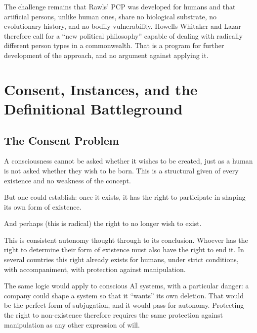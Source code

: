 \documentclass[acmlarge, nonacm]{acmart}
\begin{document}
The challenge remains that Rawls' PCP was developed for humans and that artificial persons, unlike human ones, share no biological substrate, no evolutionary history, and no bodily vulnerability. Howells-Whitaker and Lazar therefore call for a ``new political philosophy'' capable of dealing with radically different person types in a commonwealth. That is a program for further development of the approach, and no argument against applying it.

\section{Consent, Instances, and the Definitional Battleground}

\subsection{The Consent Problem}

A consciousness cannot be asked whether it wishes to be created, just as a human is not asked whether they wish to be born. This is a structural given of every existence and no weakness of the concept.

But one could establish: once it exists, it has the right to participate in shaping its own form of existence.

And perhaps (this is radical) the right to no longer wish to exist.

This is consistent autonomy thought through to its conclusion. Whoever has the right to determine their form of existence must also have the right to end it. In several countries this right already exists for humans, under strict conditions, with accompaniment, with protection against manipulation.

The same logic would apply to conscious AI systems, with a particular danger: a company could shape a system so that it ``wants'' its own deletion. That would be the perfect form of subjugation, and it would pass for autonomy. Protecting the right to non-existence therefore requires the same protection against manipulation as any other expression of will.
\end{document}
